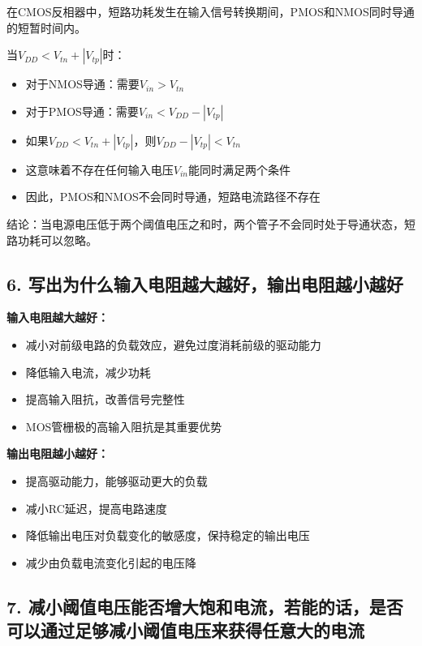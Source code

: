 \documentclass[UTF8,12pt,a4paper]{ctexart}
\begin{document}
在CMOS反相器中，短路功耗发生在输入信号转换期间，PMOS和NMOS同时导通的短暂时间内。

当$V_{DD} < V_{tn} + |V_{tp}|$时：

\begin{itemize}
    \item 对于NMOS导通：需要$V_{in} > V_{tn}$
    \item 对于PMOS导通：需要$V_{in} < V_{DD} - |V_{tp}|$
    \item 如果$V_{DD} < V_{tn} + |V_{tp}|$，则$V_{DD} - |V_{tp}| < V_{tn}$
    \item 这意味着不存在任何输入电压$V_{in}$能同时满足两个条件
    \item 因此，PMOS和NMOS不会同时导通，短路电流路径不存在
\end{itemize}

结论：当电源电压低于两个阈值电压之和时，两个管子不会同时处于导通状态，短路功耗可以忽略。

\subsection*{6. 写出为什么输入电阻越大越好，输出电阻越小越好}

\textbf{输入电阻越大越好：}

\begin{itemize}
    \item 减小对前级电路的负载效应，避免过度消耗前级的驱动能力
    \item 降低输入电流，减少功耗
    \item 提高输入阻抗，改善信号完整性
    \item MOS管栅极的高输入阻抗是其重要优势
\end{itemize}

\textbf{输出电阻越小越好：}

\begin{itemize}
    \item 提高驱动能力，能够驱动更大的负载
    \item 减小RC延迟，提高电路速度
    \item 降低输出电压对负载变化的敏感度，保持稳定的输出电压
    \item 减少由负载电流变化引起的电压降
\end{itemize}

\subsection*{7. 减小阈值电压能否增大饱和电流，若能的话，是否可以通过足够减小阈值电压来获得任意大的电流}
\end{document}

